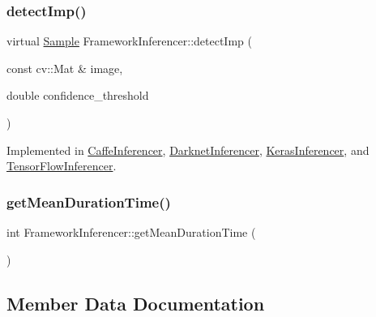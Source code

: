 \mbox{\label{class_framework_inferencer_a8fd7e708c8be4471bc2b37a4193a9045}} 
\subsubsection{\texorpdfstring{detect\+Imp()}{detectImp()}}
{\footnotesize\ttfamily virtual \hyperlink{struct_sample}{Sample} Framework\+Inferencer\+::detect\+Imp (\begin{DoxyParamCaption}\item[{const cv\+::\+Mat \&}]{image,  }\item[{double}]{confidence\+\_\+threshold }\end{DoxyParamCaption})\hspace{0.3cm}{\ttfamily [pure virtual]}}



Implemented in \hyperlink{class_caffe_inferencer_a898f6d0e7106ac663a6c26ecdf799502}{Caffe\+Inferencer}, \hyperlink{class_darknet_inferencer_a9fb53792b71055b3104e5a54a6190c50}{Darknet\+Inferencer}, \hyperlink{class_keras_inferencer_a4c944e963e3ec3ca8fa0bd4b229a8931}{Keras\+Inferencer}, and \hyperlink{class_tensor_flow_inferencer_ae8b603ab05273a9ec5fee720f23d0c58}{Tensor\+Flow\+Inferencer}.

\mbox{\label{class_framework_inferencer_a51291e562ddc5a4b86c0c413439d59a5}} 
\subsubsection{\texorpdfstring{get\+Mean\+Duration\+Time()}{getMeanDurationTime()}}
{\footnotesize\ttfamily int Framework\+Inferencer\+::get\+Mean\+Duration\+Time (\begin{DoxyParamCaption}{ }\end{DoxyParamCaption})}



\subsection{Member Data Documentation}
\mbox{\label{class_framework_inferencer_abdb304d43262f48e0438a55778c7540f}} 
